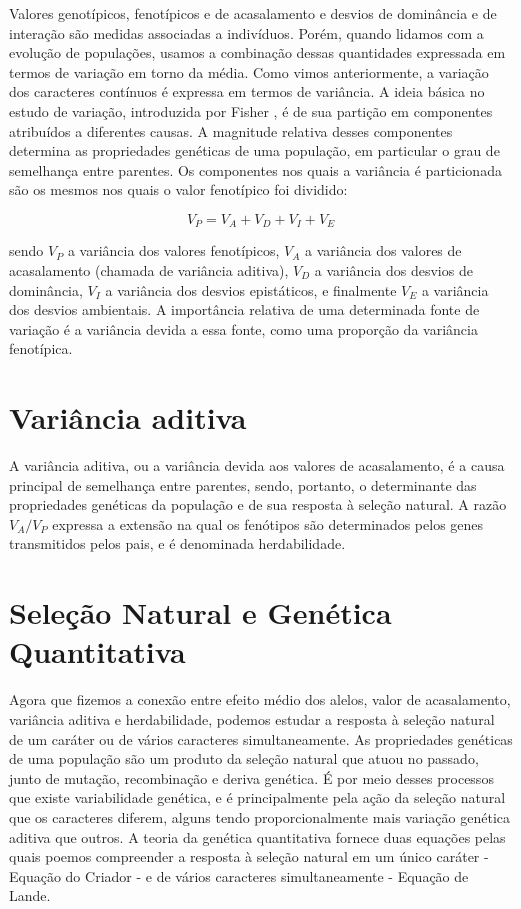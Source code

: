 \documentclass[portuges,]{tufte-handout}
\begin{document}
Valores genotípicos, fenotípicos e de acasalamento e desvios de
dominância e de interação são medidas associadas a indivíduos. Porém,
quando lidamos com a evolução de populações, usamos a combinação dessas
quantidades expressada em termos de variação em torno da média. Como
vimos anteriormente, a variação dos caracteres contínuos é expressa em
termos de variância. A ideia básica no estudo de variação, introduzida
por Fisher \cite{Fisher1918}, é de sua partição em componentes
atribuídos a diferentes causas. A magnitude relativa desses componentes
determina as propriedades genéticas de uma população, em particular o
grau de semelhança entre parentes. Os componentes nos quais a variância
é particionada são os mesmos nos quais o valor fenotípico foi dividido:

\[
V_P = V_A + V_D + V_I + V_E
\]

sendo $V_P$ a variância dos valores fenotípicos, $V_A$ a variância dos
valores de acasalamento (chamada de variância aditiva), $V_D$ a
variância dos desvios de dominância, $V_I$ a variância dos desvios
epistáticos, e finalmente $V_E$ a variância dos desvios ambientais. A
importância relativa de uma determinada fonte de variação é a variância
devida a essa fonte, como uma proporção da variância fenotípica.

\section{Variância aditiva}\label{variuxe2ncia-aditiva}

A variância aditiva, ou a variância devida aos valores de acasalamento,
é a causa principal de semelhança entre parentes, sendo, portanto, o
determinante das propriedades genéticas da população e de sua resposta à
seleção natural. A razão $V_A/V_P$ expressa a extensão na qual os
fenótipos são determinados pelos genes transmitidos pelos pais, e é
denominada herdabilidade.

\section{Seleção Natural e Genética
Quantitativa}\label{seleuxe7uxe3o-natural-e-genuxe9tica-quantitativa}

Agora que fizemos a conexão entre efeito médio dos alelos, valor de
acasalamento, variância aditiva e herdabilidade, podemos estudar a
resposta à seleção natural de um caráter ou de vários caracteres
simultaneamente. As propriedades genéticas de uma população são um
produto da seleção natural que atuou no passado, junto de mutação,
recombinação e deriva genética. É por meio desses processos que existe
variabilidade genética, e é principalmente pela ação da seleção natural
que os caracteres diferem, alguns tendo proporcionalmente mais variação
genética aditiva que outros. A teoria da genética quantitativa fornece
duas equações pelas quais poemos compreender a resposta à seleção
natural em um único caráter - Equação do Criador - e de vários
caracteres simultaneamente - Equação de Lande.
\end{document}
